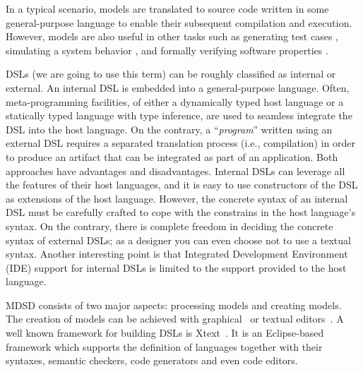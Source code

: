 In a typical scenario, models are translated to source code written in some general-purpose language to enable their subsequent compilation and execution.
However, models are also useful in other tasks such as generating test cases \cite{Kiffe2009,Gutierrez2015}, simulating a system behavior \cite{Broenink2012,brosig2015a,Bocciarelli2015425}, and formally verifying software properties \cite{Holzmann2004,Henriksson2005101,Moffett2013,DiGuglielmo20132013}. 

DSLs (we are going to use this term) can be roughly classified as internal or external.
An internal DSL is embedded into a general-purpose language.
Often, meta-programming facilities, of either a dynamically typed host language or a statically typed language with type inference, are used to seamless integrate the DSL into the host language.
On the contrary, a ``\textit{program}'' written using an external DSL requires a separated translation process (i.e., compilation) in order to produce an artifact that can be integrated as part of an application.
Both approaches have advantages and disadvantages.
Internal DSLs can leverage all the features of their host languages, and it is easy to use constructors of the DSL as extensions of the host language.
However, the concrete syntax of an internal DSL must be carefully crafted to cope with the constrains in the host language's syntax.
On the contrary, there is complete freedom in deciding the concrete syntax of external DSLs; as a designer you can even choose not to use a textual syntax.
Another interesting point is that Integrated Development Environment (IDE) support for internal DSLs is limited to the support provided to the host language.

MDSD consists of two major aspects: processing models and creating models.
The creation of models can be achieved with graphical~\cite{Kolovos:2009:RLA:1564600.1564699, Biermann:2006:GDI:2087202.2087244} or textual editors~\cite{Merkle:2010:TMT:1869542.1869564}.
A well known framework for building DSLs is Xtext~\cite{Eysholdt:2010:XIY:1869542.1869625}.
It is an Eclipse-based framework which supports the definition of languages together with their syntaxes, semantic checkers, code generators and even code editors.

